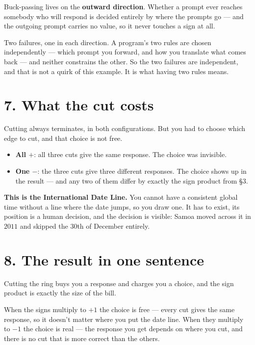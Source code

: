 \documentclass[11pt,a4paper]{article}
\begin{document}
Buck-passing lives on the \textbf{outward direction}. Whether a prompt ever
reaches somebody who will respond is decided entirely by where the prompts go
--- and the outgoing prompt carries no value, so it never touches a sign at
all.

Two failures, one in each direction. A program's two rules are chosen
independently --- which prompt you forward, and how you translate what comes
back --- and neither constrains the other. So the two failures are independent,
and that is not a quirk of this example. It is what having two rules means.

\section*{7. What the cut costs}

Cutting always terminates, in both configurations. But you had to choose which
edge to cut, and that choice is not free.

\begin{itemize}
\item \textbf{All $+$}: all three cuts give the same response. The choice was
      invisible.
\item \textbf{One $-$}: the three cuts give three different responses. The choice
      shows up in the result --- and any two of them differ by exactly the sign
      product from \S3.
\end{itemize}

\begin{keybox}
\textbf{This is the International Date Line.} You cannot have a consistent
global time without a line where the date jumps, so you draw one. It has to
exist, its position is a human decision, and the decision is visible: Samoa
moved across it in $2011$ and skipped the $30$th of December entirely.
\end{keybox}

\section*{8. The result in one sentence}

Cutting the ring buys you a response and charges you a choice, and the sign
product is exactly the size of the bill.

When the signs multiply to $+1$ the choice is free --- every cut gives the same
response, so it doesn't matter where you put the date line. When they multiply to
$-1$ the choice is real --- the response you get depends on where you cut, and
there is no cut that is more correct than the others.
\end{document}
